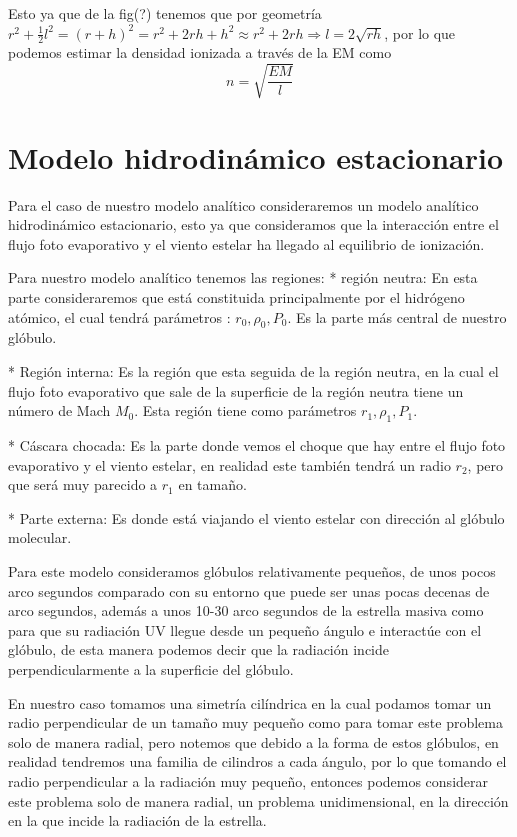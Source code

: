 \documentclass{book}
\begin{document}

Esto ya que de la fig(?) tenemos que por geometría $r^2+\frac{1}{2}l^2=(r+h)^2=r^2+2rh+h^2\approx r^2+2rh\Rightarrow l=2\sqrt{rh}$, por lo que podemos estimar la densidad ionizada a través de la EM como \[n=\sqrt{\frac{EM}{l}}\]

\section{Modelo hidrodinámico estacionario}

Para el caso de nuestro modelo analítico consideraremos un modelo analítico hidrodinámico estacionario, esto ya que consideramos que la interacción entre el flujo foto evaporativo y el viento estelar ha llegado al equilibrio de ionización.


Para nuestro modelo analítico tenemos las regiones:
* región neutra: En esta parte consideraremos que está constituida principalmente por el hidrógeno atómico, el cual tendrá parámetros : $r_0,\rho_0,P_0$. Es la parte más central de nuestro glóbulo.

* Región interna: Es la región que esta seguida de la región neutra, en la cual el flujo foto evaporativo que sale de la superficie de la región neutra tiene un número de Mach $M_0$. Esta región tiene como parámetros $r_1,\rho_1,P_1$.

* Cáscara chocada: Es la parte donde vemos el choque que hay entre el flujo foto evaporativo y el viento estelar, en realidad este también tendrá un radio $r_2$, pero que será muy parecido a $r_1$ en tamaño.  

* Parte externa: Es donde está viajando el viento estelar con dirección al glóbulo molecular.

Para este modelo consideramos glóbulos relativamente pequeños, de unos pocos arco segundos comparado con su entorno que puede ser unas pocas decenas de arco segundos, además a unos 10-30 arco segundos de la estrella masiva como para que su radiación UV llegue desde un pequeño ángulo e interactúe con el glóbulo, de esta manera podemos decir que la radiación incide perpendicularmente a la superficie del glóbulo.

En nuestro caso tomamos una simetría cilíndrica en la cual podamos tomar un radio perpendicular de un tamaño muy pequeño como para tomar este problema solo de manera radial, pero notemos que debido a la forma de estos glóbulos, en realidad tendremos una familia de cilindros a cada ángulo, por lo que tomando el radio perpendicular a la radiación muy pequeño, entonces podemos considerar este problema solo de manera radial, un problema unidimensional, en la dirección en la que incide la radiación de la estrella.
\end{document}
